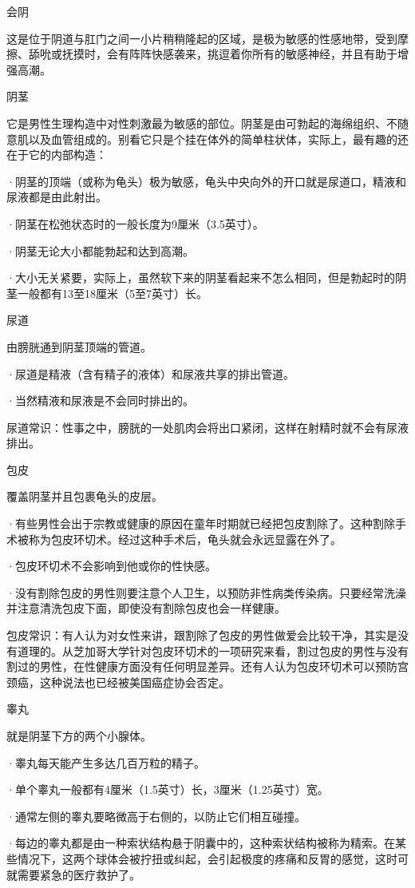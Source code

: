 \documentclass[12pt,UTF8,openany]{ctexbook}
\begin{document}
会阴

这是位于阴道与肛门之间一小片稍稍隆起的区域，是极为敏感的性感地带，受到摩擦、舔吮或抚摸时，会有阵阵快感袭来，挑逗着你所有的敏感神经，并且有助于增强高潮。


阴茎

它是男性生理构造中对性刺激最为敏感的部位。阴茎是由可勃起的海绵组织、不随意肌以及血管组成的。别看它只是个挂在体外的简单柱状体，实际上，最有趣的还在于它的内部构造：

·阴茎的顶端（或称为龟头）极为敏感，龟头中央向外的开口就是尿道口，精液和尿液都是由此射出。

·阴茎在松弛状态时的一般长度为9厘米（3.5英寸）。

·阴茎无论大小都能勃起和达到高潮。

·大小无关紧要，实际上，虽然软下来的阴茎看起来不怎么相同，但是勃起时的阴茎一般都有13至18厘米（5至7英寸）长。

尿道

由膀胱通到阴茎顶端的管道。

·尿道是精液（含有精子的液体）和尿液共享的排出管道。

·当然精液和尿液是不会同时排出的。

尿道常识：性事之中，膀胱的一处肌肉会将出口紧闭，这样在射精时就不会有尿液排出。

包皮

覆盖阴茎并且包裹龟头的皮层。

·有些男性会出于宗教或健康的原因在童年时期就已经把包皮割除了。这种割除手术被称为包皮环切术。经过这种手术后，龟头就会永远显露在外了。

·包皮环切术不会影响到他或你的性快感。

·没有割除包皮的男性则要注意个人卫生，以预防非性病类传染病。只要经常洗澡并注意清洗包皮下面，即使没有割除包皮也会一样健康。

包皮常识：有人认为对女性来讲，跟割除了包皮的男性做爱会比较干净，其实是没有道理的。从芝加哥大学针对包皮环切术的一项研究来看，割过包皮的男性与没有割过的男性，在性健康方面没有任何明显差异。还有人认为包皮环切术可以预防宫颈癌，这种说法也已经被美国癌症协会否定。

睾丸

就是阴茎下方的两个小腺体。

·睾丸每天能产生多达几百万粒的精子。

·单个睾丸一般都有4厘米（1.5英寸）长，3厘米（1.25英寸）宽。

·通常左侧的睾丸要略微高于右侧的，以防止它们相互碰撞。

·每边的睾丸都是由一种索状结构悬于阴囊中的，这种索状结构被称为精索。在某些情况下，这两个球体会被拧扭或纠起，会引起极度的疼痛和反胃的感觉，这时可就需要紧急的医疗救护了。
\end{document}
